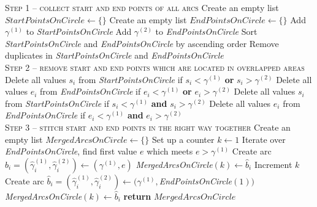 \begin{algorithmic}[1]
    \State \textsc{Step 1 – collect start and end points of all arcs}
    \State Create an empty list $\textit{StartPointsOnCircle} \gets \{\}$
	\State Create an empty list $\textit{EndPointsOnCircle} \gets \{\}$
		\State Add $\gamma^{(1)}$ to \textit{StartPointsOnCircle}
		\State Add $\gamma^{(2)}$ to \textit{EndPointsOnCircle}
	\EndFor
	\State Sort \textit{StartPointsOnCircle} and \textit{EndPointsOnCircle} by ascending order
	\State Remove duplicates in \textit{StartPointsOnCircle} and \textit{EndPointsOnCircle}
	\\
	\State \textsc{Step 2 – remove start and end points which are located in overlapped areas}
			\State Delete all values $s_i$ from \textit{StartPointsOnCircle} if $s_i < \gamma^{(1)}$ \textbf{or} $s_i > \gamma^{(2)}$
			\State Delete all values $e_i$ from \textit{EndPointsOnCircle} if $e_i < 				\gamma^{(1)}$ \textbf{or} $e_i > \gamma^{(2)}$
		\Else %
			\State Delete all values $s_i$ from \textit{StartPointsOnCircle} if $s_i < 				\gamma^{(1)}$ \textbf{and} $s_i > \gamma^{(2)}$
			\State Delete all values $e_i$ from \textit{EndPointsOnCircle} if $e_i < 				\gamma^{(1)}$ \textbf{and} $e_i > \gamma^{(2)}$
		\EndIf
	\EndFor
	\\
	\State \textsc{Step 3 – stitch start and end points in the right way together}
	\State Create an empty list $\textit{MergedArcsOnCircle} \gets \{\}$
	\State Set up a counter $k \gets 1$ 
		\State Iterate over \textit{EndPointsOnCircle},
			   find first value $e$ which meets $e > \gamma^{(1)}$
			\State Create arc $\hat{b}_i = (\hat{\gamma}_i^{(1)},\hat{\gamma}_i^{(2)}) \gets (\gamma^{(1)},e)$
			\State \textit{MergedArcsOnCircle}$(k) \gets \hat{b}_i$
			\State Increment $k$
		\Else
			\State Create arc $\hat{b}_i = (\hat{\gamma}_i^{(1)},\hat{\gamma}_i^{(2)}) \gets (\gamma^{(1)},$\textit{EndPointsOnCircle}$(1))$
			\State \textit{MergedArcsOnCircle}$(k) \gets \hat{b}_i$
		\EndIf
	\EndFor
	\State \textbf{return} $\textit{MergedArcsOnCircle}$
    \EndProcedure
  \end{algorithmic}
